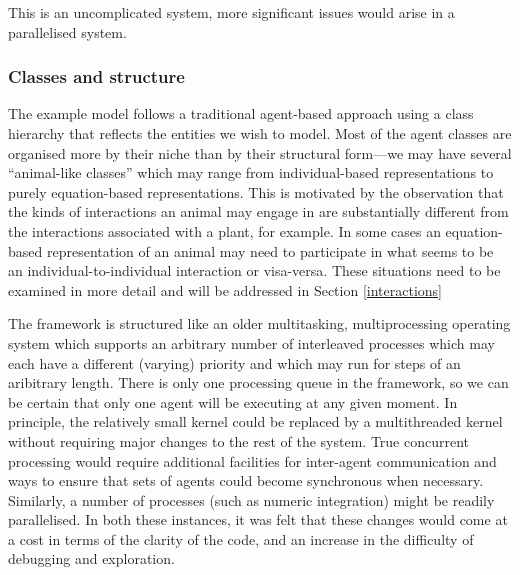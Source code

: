 This is an uncomplicated system, more significant issues would arise
in a parallelised system.  


\subsubsection{Classes and structure}

The example model follows a traditional agent-based approach using a
class hierarchy that reflects the entities we wish to model. Most of
the agent classes are organised more by their niche than by their
structural form---we may have several ``animal-like classes'' which
may range from individual-based representations to purely
equation-based representations. This is motivated by the observation
that the kinds of interactions an animal may engage in are
substantially different from the interactions associated with a plant,
for example.  In some cases an equation-based representation of an
animal may need to participate in what seems to be an
individual-to-individual interaction or visa-versa.  These situations
need to be examined in more detail and will be addressed in Section
\ref{interactions}


The framework is structured like an older multitasking,
multiprocessing operating system which supports an arbitrary number of
interleaved processes which may each have a different (varying)
priority and which may run for steps of an aribitrary length. There is
only one processing queue in the framework, so we can be certain that
only one agent will be executing at any given moment.  In principle,
the relatively small kernel could be replaced by a multithreaded
kernel without requiring major changes to the rest of the system. True
concurrent processing would require additional facilities for
inter-agent communication and ways to ensure that sets of agents could
become synchronous when necessary. Similarly, a number of processes
(such as numeric integration) might be readily parallelised.  In both
these instances, it was felt that these changes would come at a cost
in terms of the clarity of the code, and an increase in the difficulty
of debugging and exploration.

